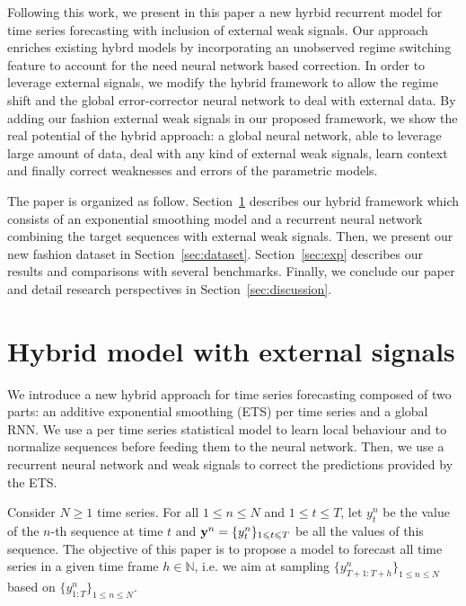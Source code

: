 \documentclass[letterpaper]{article} %
\newcommand{\ts}{y}
\newcommand{\fullts}{{\bf \ts}}
\newcommand{\lag}{h}
\begin{document}
Following this work, we present in this paper a new hyrbid recurrent model for time series forecasting with inclusion of external weak signals. %
Our approach enriches existing hybrd models  by incorporating an unobserved regime switching feature to account for the need neural network based correction. In order to leverage external signals, we modify the hybrid framework to allow the regime shift and the  global error-corrector neural network to deal with external data. By adding our fashion external weak signals in our proposed framework, we show the real potential of the hybrid approach: a global neural network, able to leverage large amount of data, deal with any kind of external weak signals, learn context and finally correct weaknesses and errors of the parametric models.

The paper is organized as follow. Section~\ref{sec:hybrid} describes our hybrid framework which consists of an exponential smoothing model and a recurrent neural network combining the target sequences with external weak signals. Then, we present our new fashion dataset in Section~\ref{sec:dataset}. Section~\ref{sec:exp} describes our results and comparisons with several benchmarks. Finally, we conclude our paper and detail research perspectives in Section~\ref{sec:discussion}.


\section{Hybrid model with external signals}
\label{sec:hybrid}
We introduce a new hybrid approach for time series forecasting  composed of two parts: an additive exponential smoothing (ETS) per time series and a global RNN. We use a per time series statistical model to learn local behaviour and to normalize sequences before feeding them to the neural network. Then, we use a recurrent neural network and weak signals to correct the predictions provided by the ETS.

Consider $N\geqslant 1$ time series. For all $1\leqslant n \leqslant N$ and $1\leqslant t \leqslant T$, let $\ts_t^n$ be the value of the $n$-th sequence at time $t$ and  $\fullts^n = \{\ts_t^n\}_{1\leqslant t \leqslant T}$ be all the values of this sequence.   The objective of this paper is to propose a model to  forecast all time series in a given time frame  $\lag \in \mathbb{N}$, i.e. we aim at sampling $\{\ts^n_{T+1:T+\lag}\}_{1\leqslant n \leqslant N}$ based on $\{\ts^n_{1:T}\}_{1\leqslant n \leqslant N}$.
\end{document}
